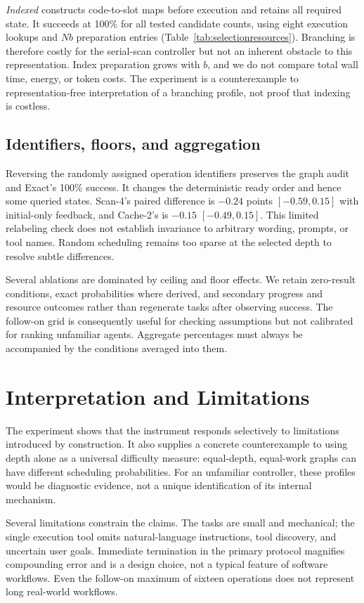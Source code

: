 \documentclass[sigconf,nonacm]{acmart}
\begin{document}
\emph{Indexed} constructs code-to-slot maps before execution and retains
all required state. It succeeds at 100\% for all tested candidate counts,
using eight execution lookups and $Nb$ preparation entries
(Table~\ref{tab:selectionresources}). Branching is therefore costly for the
serial-scan controller but not an inherent obstacle to this representation.
Index preparation grows with $b$, and we do not compare total wall time,
energy, or token costs. The experiment is a counterexample to
representation-free interpretation of a branching profile, not proof that
indexing is costless.

\subsection{Identifiers, floors, and aggregation}
Reversing the randomly assigned operation identifiers preserves the graph
audit and Exact's 100\% success. It changes the deterministic ready order
and hence some queried states. Scan-4's paired difference is $-0.24$ points
$[-0.59,0.15]$ with initial-only feedback, and Cache-2's is $-0.15$
$[-0.49,0.15]$. This limited relabeling check does not establish invariance
to arbitrary wording, prompts, or tool names. Random scheduling remains
too sparse at the selected depth to resolve subtle differences.

Several ablations are dominated by ceiling and floor effects. We retain
zero-result conditions, exact probabilities where derived, and secondary
progress and resource outcomes rather than regenerate tasks after observing
success. The follow-on grid is consequently useful for checking assumptions
but not calibrated for ranking unfamiliar agents. Aggregate percentages
must always be accompanied by the conditions averaged into them.

\section{Interpretation and Limitations}
The experiment shows that the instrument responds selectively to
limitations introduced by construction. It also supplies a concrete
counterexample to using depth alone as a universal difficulty measure:
equal-depth, equal-work graphs can have different scheduling probabilities.
For an unfamiliar controller, these profiles would be diagnostic evidence,
not a unique identification of its internal mechanism.

Several limitations constrain the claims. The tasks are small and
mechanical; the single execution tool omits natural-language instructions,
tool discovery, and uncertain user goals. Immediate termination in the
primary protocol
magnifies compounding error and is a design choice, not a typical feature
of software workflows. Even the follow-on maximum of sixteen operations
does not represent long real-world workflows.
\end{document}
